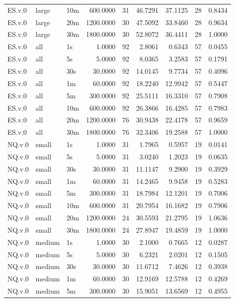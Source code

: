 \begin{tabular}{lllrrrrrr}
ES.v.0 & large & 10m & 600.0000 & 31 & 46.7291 & 37.1125 & 28 & 0.8434 \\
ES.v.0 & large & 20m & 1200.0000 & 30 & 47.5092 & 33.8460 & 28 & 0.9634 \\
ES.v.0 & large & 30m & 1800.0000 & 30 & 52.8072 & 36.4411 & 28 & 1.0000 \\
ES.v.0 & all & 1s & 1.0000 & 92 & 2.8061 & 0.6343 & 57 & 0.0455 \\
ES.v.0 & all & 5s & 5.0000 & 92 & 8.0365 & 3.2583 & 57 & 0.1791 \\
ES.v.0 & all & 30s & 30.0000 & 92 & 14.0145 & 9.7734 & 57 & 0.4096 \\
ES.v.0 & all & 1m & 60.0000 & 92 & 18.2240 & 12.9942 & 57 & 0.5447 \\
ES.v.0 & all & 5m & 300.0000 & 92 & 25.5111 & 16.3310 & 57 & 0.7908 \\
ES.v.0 & all & 10m & 600.0000 & 92 & 26.3866 & 16.4285 & 57 & 0.7983 \\
ES.v.0 & all & 20m & 1200.0000 & 76 & 30.9438 & 22.4178 & 57 & 0.9659 \\
ES.v.0 & all & 30m & 1800.0000 & 76 & 32.3406 & 19.2588 & 57 & 1.0000 \\
NQ.v.0 & small & 1s & 1.0000 & 31 & 1.7965 & 0.5957 & 19 & 0.0141 \\
NQ.v.0 & small & 5s & 5.0000 & 31 & 3.0240 & 1.2023 & 19 & 0.0635 \\
NQ.v.0 & small & 30s & 30.0000 & 31 & 11.1147 & 9.2900 & 19 & 0.3929 \\
NQ.v.0 & small & 1m & 60.0000 & 31 & 14.2465 & 9.9458 & 19 & 0.5283 \\
NQ.v.0 & small & 5m & 300.0000 & 31 & 18.7984 & 12.1201 & 19 & 0.7006 \\
NQ.v.0 & small & 10m & 600.0000 & 31 & 20.7954 & 16.1682 & 19 & 0.7906 \\
NQ.v.0 & small & 20m & 1200.0000 & 24 & 30.5593 & 21.2795 & 19 & 1.0636 \\
NQ.v.0 & small & 30m & 1800.0000 & 24 & 27.8947 & 19.4859 & 19 & 1.0000 \\
NQ.v.0 & medium & 1s & 1.0000 & 30 & 2.1000 & 0.7665 & 12 & 0.0287 \\
NQ.v.0 & medium & 5s & 5.0000 & 30 & 6.2321 & 2.0201 & 12 & 0.1505 \\
NQ.v.0 & medium & 30s & 30.0000 & 30 & 11.6712 & 7.4626 & 12 & 0.3938 \\
NQ.v.0 & medium & 1m & 60.0000 & 30 & 12.9169 & 12.5788 & 12 & 0.4269 \\
NQ.v.0 & medium & 5m & 300.0000 & 30 & 15.9051 & 13.6569 & 12 & 0.4955 \\

\end{tabular}
